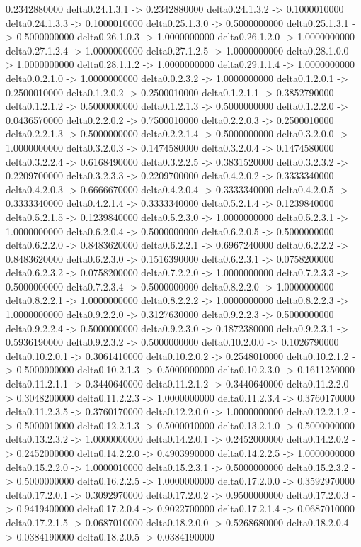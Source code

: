0.2342880000    delta0.24.1.3.1 -> 0.2342880000    delta0.24.1.3.2 -> 0.1000010000    delta0.24.1.3.3 -> 0.1000010000    delta0.25.1.3.0 -> 0.5000000000    delta0.25.1.3.1 -> 0.5000000000    delta0.26.1.0.3 -> 1.0000000000    delta0.26.1.2.0 -> 1.0000000000    delta0.27.1.2.4 -> 1.0000000000    delta0.27.1.2.5 -> 1.0000000000    delta0.28.1.0.0 -> 1.0000000000    delta0.28.1.1.2 -> 1.0000000000    delta0.29.1.1.4 -> 1.0000000000    delta0.0.2.1.0 -> 1.0000000000    delta0.0.2.3.2 -> 1.0000000000    delta0.1.2.0.1 -> 0.2500010000    delta0.1.2.0.2 -> 0.2500010000    delta0.1.2.1.1 -> 0.3852790000    delta0.1.2.1.2 -> 0.5000000000    delta0.1.2.1.3 -> 0.5000000000    delta0.1.2.2.0 -> 0.0436570000    delta0.2.2.0.2 -> 0.7500010000    delta0.2.2.0.3 -> 0.2500010000    delta0.2.2.1.3 -> 0.5000000000    delta0.2.2.1.4 -> 0.5000000000    delta0.3.2.0.0 -> 1.0000000000    delta0.3.2.0.3 -> 0.1474580000    delta0.3.2.0.4 -> 0.1474580000    delta0.3.2.2.4 -> 0.6168490000    delta0.3.2.2.5 -> 0.3831520000    delta0.3.2.3.2 -> 0.2209700000    delta0.3.2.3.3 -> 0.2209700000    delta0.4.2.0.2 -> 0.3333340000    delta0.4.2.0.3 -> 0.6666670000    delta0.4.2.0.4 -> 0.3333340000    delta0.4.2.0.5 -> 0.3333340000    delta0.4.2.1.4 -> 0.3333340000    delta0.5.2.1.4 -> 0.1239840000    delta0.5.2.1.5 -> 0.1239840000    delta0.5.2.3.0 -> 1.0000000000    delta0.5.2.3.1 -> 1.0000000000    delta0.6.2.0.4 -> 0.5000000000    delta0.6.2.0.5 -> 0.5000000000    delta0.6.2.2.0 -> 0.8483620000    delta0.6.2.2.1 -> 0.6967240000    delta0.6.2.2.2 -> 0.8483620000    delta0.6.2.3.0 -> 0.1516390000    delta0.6.2.3.1 -> 0.0758200000    delta0.6.2.3.2 -> 0.0758200000    delta0.7.2.2.0 -> 1.0000000000    delta0.7.2.3.3 -> 0.5000000000    delta0.7.2.3.4 -> 0.5000000000    delta0.8.2.2.0 -> 1.0000000000    delta0.8.2.2.1 -> 1.0000000000    delta0.8.2.2.2 -> 1.0000000000    delta0.8.2.2.3 -> 1.0000000000    delta0.9.2.2.0 -> 0.3127630000    delta0.9.2.2.3 -> 0.5000000000    delta0.9.2.2.4 -> 0.5000000000    delta0.9.2.3.0 -> 0.1872380000    delta0.9.2.3.1 -> 0.5936190000    delta0.9.2.3.2 -> 0.5000000000    delta0.10.2.0.0 -> 0.1026790000    delta0.10.2.0.1 -> 0.3061410000    delta0.10.2.0.2 -> 0.2548010000    delta0.10.2.1.2 -> 0.5000000000    delta0.10.2.1.3 -> 0.5000000000    delta0.10.2.3.0 -> 0.1611250000    delta0.11.2.1.1 -> 0.3440640000    delta0.11.2.1.2 -> 0.3440640000    delta0.11.2.2.0 -> 0.3048200000    delta0.11.2.2.3 -> 1.0000000000    delta0.11.2.3.4 -> 0.3760170000    delta0.11.2.3.5 -> 0.3760170000    delta0.12.2.0.0 -> 1.0000000000    delta0.12.2.1.2 -> 0.5000010000    delta0.12.2.1.3 -> 0.5000010000    delta0.13.2.1.0 -> 0.5000000000    delta0.13.2.3.2 -> 1.0000000000    delta0.14.2.0.1 -> 0.2452000000    delta0.14.2.0.2 -> 0.2452000000    delta0.14.2.2.0 -> 0.4903990000    delta0.14.2.2.5 -> 1.0000000000    delta0.15.2.2.0 -> 1.0000010000    delta0.15.2.3.1 -> 0.5000000000    delta0.15.2.3.2 -> 0.5000000000    delta0.16.2.2.5 -> 1.0000000000    delta0.17.2.0.0 -> 0.3592970000    delta0.17.2.0.1 -> 0.3092970000    delta0.17.2.0.2 -> 0.9500000000    delta0.17.2.0.3 -> 0.9419400000    delta0.17.2.0.4 -> 0.9022700000    delta0.17.2.1.4 -> 0.0687010000    delta0.17.2.1.5 -> 0.0687010000    delta0.18.2.0.0 -> 0.5268680000    delta0.18.2.0.4 -> 0.0384190000    delta0.18.2.0.5 -> 0.0384190000    